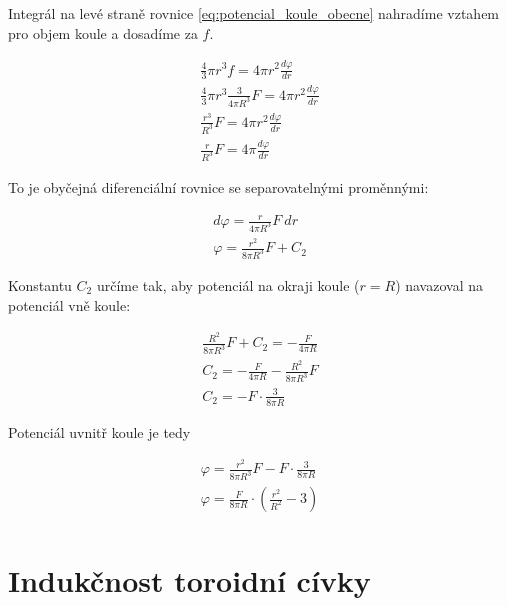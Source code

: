 \documentclass{book}
\begin{document}
Integrál na levé straně rovnice \eqref{eq:potencial_koule_obecne} nahradíme vztahem pro objem koule a dosadíme za \(f\).

\begin{equation}
\begin{split}
\frac{4}{3} \pi r^3 f = 4 \pi r^2 \frac{d \varphi}{dr} \\
\frac{4}{3} \pi r^3 \frac{3}{4 \pi R^3} F = 4 \pi r^2 \frac{d \varphi}{dr} \\
\frac{r^3}{R^3} F = 4 \pi r^2 \frac{d \varphi}{dr} \\
\frac{r}{R^3} F = 4 \pi \frac{d \varphi}{dr}
\end{split}
\end{equation}

To je obyčejná diferenciální rovnice se separovatelnými proměnnými:

\begin{equation}
\label{eq:potencial_disku_uvnitr}
\begin{split}
d \varphi = \frac{r}{4 \pi R^3} F \ dr \\
\varphi = \frac{r^2}{8 \pi R^3} F + C_2
\end{split}
\end{equation}

Konstantu \(C_2\) určíme tak, aby potenciál na okraji koule (\(r = R\)) navazoval na potenciál vně koule:

\begin{equation}
\begin{split}
\frac{R^2}{8 \pi R^3} F + C_2 = -\frac{F}{4 \pi R} \\
C_2 = -\frac{F}{4 \pi R} - \frac{R^2}{8 \pi R^3} F \\
C_2 = -F \cdot \frac{3}{8 \pi R}
\end{split}
\end{equation}

Potenciál uvnitř koule je tedy

\begin{equation}
\begin{split}
\varphi = \frac{r^2}{8 \pi R^3} F - F \cdot \frac{3}{8 \pi R} \\
\varphi = \frac{F}{8 \pi R} \cdot \left(\frac{r^2}{R^2} - 3 \right) \\
\end{split}
\end{equation}

\section{Indukčnost toroidní cívky}
\end{document}
